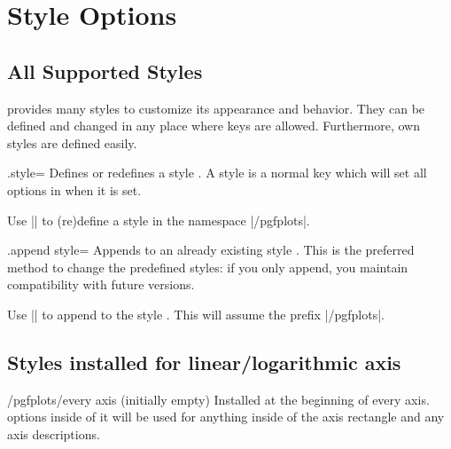 
\section{Style Options}
\label{sec:styles}


\subsection{All Supported Styles}

\PGFPlots{} provides many styles to customize its appearance and behavior. They
can be defined and changed in any place where keys are allowed. Furthermore,
own styles are defined easily.

\begin{handler}{{.style}=}
    Defines or redefines a style . A style is a normal key which will
    set all options in  when it is set.

    Use || to
    (re)define a style  in the namespace |/pgfplots|.
\end{handler}

\begin{handler}{{.append style}=}
    Appends  to an already existing style . This
    is the preferred method to change the predefined styles: if you only
    append, you maintain compatibility with future versions.

    Use || to
    append  to the style . This will assume the
    prefix |/pgfplots|.
\end{handler}


\subsection*{Styles installed for linear/logarithmic axis}

\begin{stylekey}{/pgfplots/every axis (initially empty)}
    Installed at the beginning of every axis. \Tikz{} options inside of it will
    be used for anything inside of the axis rectangle and any axis
    descriptions.
\end{stylekey}

